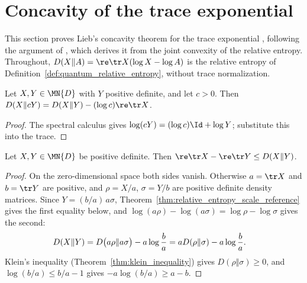 \section{Concavity of the trace exponential}

This section proves Lieb's concavity theorem for the trace exponential
\cite[Theorem~6]{Lieb1973Convex}, following the argument of
\cite{Tropp2012Joint}, which derives it from the joint convexity of the
relative entropy. Throughout, $D(X\Vert A)=\re\tr X(\log X-\log A)$ is the
relative entropy of Definition~\ref{def:quantum_relative_entropy}, without
trace normalization.

\begin{theorem}
    \label{thm:relative_entropy_scale_reference}
    \leanok
    Let $X,Y\in\MN{D}$ with $Y$ positive definite, and let $c>0$. Then
    $D(X\Vert cY)=D(X\Vert Y)-(\log c)\re\tr X$.
\end{theorem}

\begin{proof}\leanok
    The spectral calculus gives $\log(cY)=(\log c)\Id+\log Y$; substitute this
    into the trace.
\end{proof}

\begin{theorem}
    \label{thm:klein_inequality_unnormalized}
    \leanok
    Let $X,Y\in\MN{D}$ be positive definite. Then
    $\re\tr X-\re\tr Y\le D(X\Vert Y)$.
\end{theorem}

\begin{proof}\leanok
    On the zero-dimensional space both sides vanish. Otherwise $a=\tr X$ and
    $b=\tr Y$ are positive, and $\rho=X/a$, $\sigma=Y/b$ are positive definite
    density matrices. Since $Y=(b/a)\,a\sigma$,
    Theorem~\ref{thm:relative_entropy_scale_reference} gives the first equality
    below, and $\log(a\rho)-\log(a\sigma)=\log\rho-\log\sigma$ gives the
    second:
    \begin{align}
        D(X\Vert Y)
         & =D\bigl(a\rho\Vert a\sigma\bigr)-a\log\frac{b}{a}
        =aD(\rho\Vert\sigma)-a\log\frac{b}{a}.
        \notag
    \end{align}
    Klein's inequality (Theorem~\ref{thm:klein_inequality}) gives
    $D(\rho\Vert\sigma)\ge0$, and $\log(b/a)\le b/a-1$ gives
    $-a\log(b/a)\ge a-b$.
\end{proof}

